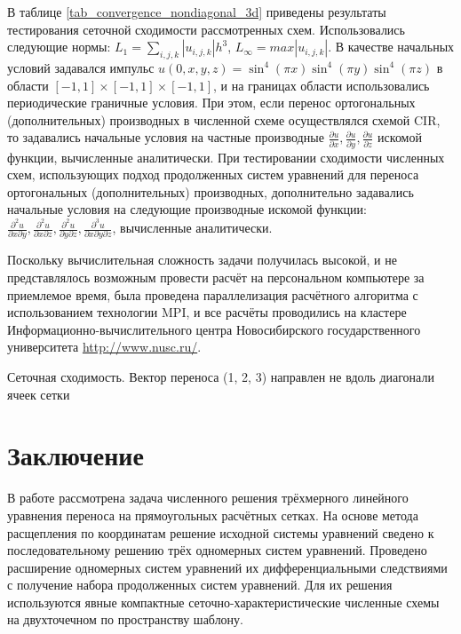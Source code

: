 \documentclass[11pt]{article}
\begin{document}
В таблице \ref{tab_convergence_nondiagonal_3d} приведены результаты тестирования сеточной сходимости рассмотренных схем.
Использовались следующие нормы: $L_1 = \sum\limits_{i, j, k} |u_{i, j, k}|h^3$, $L_{\infty} = max |u_{i, j,k}|$.
В качестве начальных условий задавался импульс $u(0, x, y, z) = \sin^4(\pi x)\sin^4(\pi y)\sin^4(\pi z)$ в области $[-1,1]\times[-1,1]\times[-1,1]$, и на границах области использовались периодические граничные условия.
При этом, если перенос ортогональных (дополнительных) производных в численной схеме осуществлялся схемой CIR, то задавались начальные условия на частные производные $\frac{\partial u}{\partial x}, \frac{\partial u}{\partial y}, \frac{\partial u}{\partial z}$ искомой функции, вычисленные аналитически.
При тестировании сходимости численных схем, использующих подход продолженных систем уравнений для переноса ортогональных (дополнительных) производных, дополнительно задавались начальные условия на следующие производные искомой функции: $\frac{\partial^2 u}{\partial x \partial y}, \frac{\partial^2 u}{\partial x \partial z}, \frac{\partial^2 u}{\partial y \partial z}, \frac{\partial^3 u}{\partial x \partial y \partial z}$, вычисленные аналитически.

Поскольку вычислительная сложность задачи получилась высокой, и не представлялось возможным провести расчёт на персональном компьютере за приемлемое время, была проведена параллелизация расчётного алгоритма с использованием технологии MPI, и все расчёты проводились на кластере Информационно-вычислительного центра Новосибирского государственного университета \href{http://www.nusc.ru/}{http://www.nusc.ru/}.

\begin{table}
\caption {Сеточная сходимость. Вектор переноса (1, 2, 3) направлен не вдоль диагонали ячеек сетки} \label{tab_convergence_nondiagonal_3d}
\bigskip

\end{table}

\section{Заключение}

В работе рассмотрена задача численного решения трёхмерного линейного уравнения переноса на прямоугольных расчётных сетках.
На основе метода расщепления по координатам решение исходной системы уравнений сведено к последовательному решению
трёх одномерных систем уравнений.
Проведено расширение одномерных систем уравнений их дифференциальными следствиями с получение набора продолженных систем уравнений.
Для их решения используются явные компактные сеточно-характеристические численные схемы на двухточечном по пространству шаблону.
\end{document}
